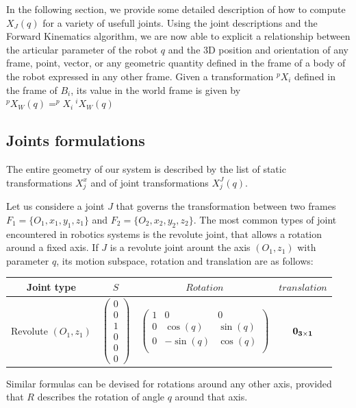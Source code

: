 In the following section, we provide some detailed description of how to compute $X_J(q)$ for a variety of usefull joints.
Using the joint descriptions and the Forward Kinematics algorithm, we are now able to explicit a relationship between the articular parameter of the robot $q$ and the 3D position and orientation of any frame, point, vector, or any geometric quantity defined in the frame of a body of the robot expressed in any other frame.
Given a transformation $^pX_i$ defined in the frame of $B_i$, its value in the world frame is given by $^pX_W(q) = ^pX_i\ ^iX_W(q)$

\subsection{Joints formulations}
\label{sub:joints_formulations}

The entire geometry of our system is described by the list of static transformations $X^x_j$ and of joint transformations $X^J_j(q)$.

Let us considere a joint $J$ that governs the transformation between two frames $F_1=\{O_1, x_1, y_1, z_1\}$ and $F_2=\{O_2, x_2, y_2, z_2\}$.
The most common types of joint encountered in robotics systems is the revolute joint, that allows a rotation around a fixed axis.
If $J$ is a revolute joint arount the axis $(O_1,z_1)$ with parameter $q$, its motion subspace, rotation and translation are as follows:

\begin{tabular}{|c|c|c|c|}
  \hline
  Joint type & $S$ & $Rotation$ & $translation$ \\
  \hline
  Revolute $(O_1,z_1)$
  &
  $\begin{pmatrix}
    0 \\ 0 \\ 1 \\ 0 \\ 0 \\ 0
  \end{pmatrix}$
  &
  $\begin{pmatrix}
    1 & 0 & 0 \\
    0 & \cos(q) & \sin(q) \\
    0 & -\sin(q) & \cos(q) \\
  \end{pmatrix}$
  &
  $\bf{0}_{3\times1}$
  \\
  \hline
\end{tabular}

Similar formulas can be devised for rotations around any other axis, provided that $R$ describes the rotation of angle $q$ around that axis.

